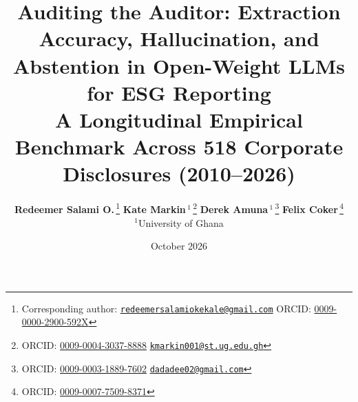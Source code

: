 \documentclass[11pt,letterpaper]{article}
\begin{document}
\title{\LARGE\bfseries Auditing the Auditor: Extraction Accuracy, Hallucination, and Abstention in Open-Weight LLMs for ESG Reporting\\[1.4ex]
\large A Longitudinal Empirical Benchmark Across 518 Corporate Disclosures (2010--2026)}

\author{
  \textbf{Redeemer Salami O.}\,\thanks{Corresponding author: \href{mailto:redeemersalamiokekale@gmail.com}{\texttt{redeemersalamiokekale@gmail.com}} \quad\textbar\quad ORCID: \href{https://orcid.org/0009-0000-2900-592X}{0009-0000-2900-592X}}\qquad
  \textbf{Kate Markin}\,$^{1}$\,\thanks{ORCID: \href{https://orcid.org/0009-0004-3037-8888}{0009-0004-3037-8888} \quad\textbar\quad \href{mailto:kmarkin001@st.ug.edu.gh}{\texttt{kmarkin001@st.ug.edu.gh}}}\qquad
  \textbf{Derek Amuna}\,$^{1}$\,\thanks{ORCID: \href{https://orcid.org/0009-0003-1889-7602}{0009-0003-1889-7602} \quad\textbar\quad \href{mailto:dadadee02@gmail.com}{\texttt{dadadee02@gmail.com}}}\qquad
  \textbf{Felix Coker}\,\thanks{ORCID: \href{https://orcid.org/0009-0007-7509-8371}{0009-0007-7509-8371}}\\[0.8ex]
  $^{1}$\normalsize University of Ghana
}
\date{\normalsize October 2026}

\maketitle
\enlargethispage{3.5\baselineskip}
\end{document}
